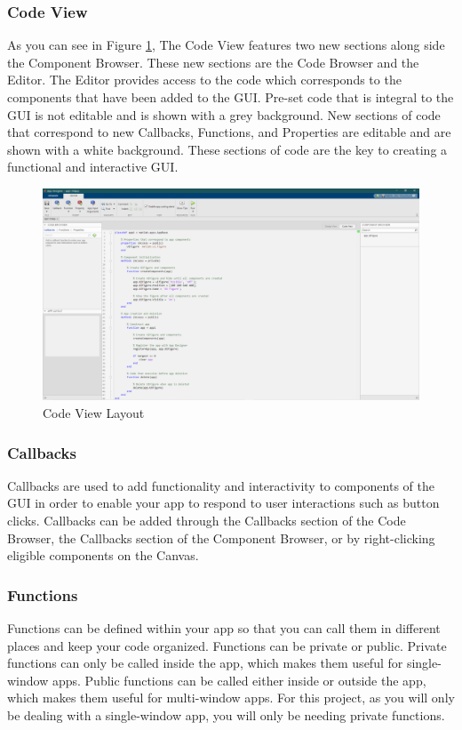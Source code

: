 \documentclass[../MATLAB_Primer.tex]{subfiles}
\begin{document}
\subsubsection{Code View}
As you can see in Figure \ref{fig:codeViewLayout}, The Code View features two new sections along side the Component Browser. These new sections are the Code Browser and the Editor. The Editor provides access to the code which corresponds to the components that have been added to the GUI. Pre-set code that is integral to the GUI is not editable and is shown with a grey background. New sections of code that correspond to new Callbacks, Functions, and Properties are editable and are shown with a white background. These sections of code are the key to creating a functional and interactive GUI.
\begin{figure}[H]
    \centering
    \includegraphics[width=426pt]{images/appDesignerCodeViewLayout.PNG}
    \caption{Code View Layout}
    \label{fig:codeViewLayout}
\end{figure}
\subsubsection{Callbacks}
Callbacks are used to add functionality and interactivity to components of the GUI in order to enable your app to respond to user interactions such as button clicks. Callbacks can be added through the Callbacks section of the Code Browser, the Callbacks section of the Component Browser, or by right-clicking eligible components on the Canvas.

\subsubsection{Functions}

Functions can be defined within your app so that you can call them in different places and keep your code organized. Functions can be private or public. Private functions can only be called inside the app, which makes them useful for single-window apps. Public functions can be called either inside or outside the app, which makes them useful for multi-window apps. For this project, as you will only be dealing with a single-window app, you will only be needing private functions.
\end{document}
